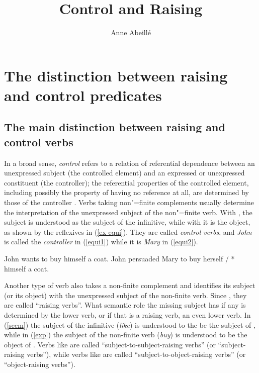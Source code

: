 \documentclass[output=paper
	        ,collection
	        ,collectionchapter
 	        ,biblatex
                ,babelshorthands
                ,newtxmath
                ,draftmode
                ,colorlinks, citecolor=brown
]{langscibook}
\author{%
	Anne Abeillé\affiliation{Université de Paris}%
}
\title{Control and Raising}
\begin{document}
\maketitle
\label{chap-control-raising}



\section{The distinction between raising and control predicates}

\subsection{The main distinction between raising and control verbs}

In a broad sense, \emph{control} refers to a relation of referential dependence between an unexpressed
subject (the controlled element) and an expressed or unexpressed constituent (the controller); the
referential properties of the controlled element, including possibly the property of having no
reference at all, are determined by those of the controller \citep[372]{Bresnan1982}. Verbs taking
non"=finite complements usually determine the interpretation of the unexpressed subject of the
non"=finite verb. With , the subject is understood as the subject of the infinitive,
while with  it is the object, as shown by the reflexives in (\ref{ex-equi}). They are
called \emph{control verbs}, and \emph{John} is called the \emph{controller} in (\ref{equi1}) while
it is \emph{Mary} in (\ref{equi2}).  

\eal
\label{ex-equi}
\ex John wants to buy himself a coat. \label{equi1}
\ex John persuaded Mary to buy herself / * himself a coat.\label{equi2}
\zl

Another type of verb also takes a non-finite complement and identifies its subject (or its object)
with the unexpressed subject of the non-finite verb. Since \citet{Postal1974}, they are called
``raising verbs''. What semantic role the missing subject has if any is determined by the lower
verb, or if that is a raising verb, an even lower verb. In (\ref{seem}) the subject of the
infinitive (\emph{like}) is understood to the be the subject of , while in (\ref{exp})
the subject of the non-finite verb (\emph{buy}) is understood to be the object of
. Verbs like  are called ``subject-to-subject-raising verbs'' (or
``subject-raising verbs''), while verbs like  are called ``subject-to-object-raising
verbs'' (or ``object-raising verbs''). 
\end{document}
